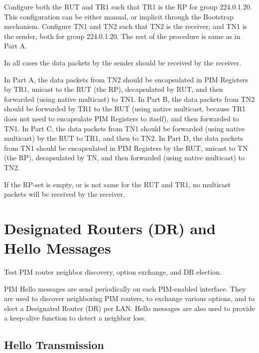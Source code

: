 \documentclass[11pt]{report}
\begin{document}

Configure both the RUT and TR1 such that TR1 is the RP for group
224.0.1.20. This configuration can be either manual, or implicit through the
Bootstrap mechanism. Configure TN1 and TN2 such that TN2 is the receiver, and
TN1 is the sender, both for group 224.0.1.20. The rest of the procedure is
same as in Part A.

In all cases the data packets by the sender should be received by the
receiver.

In Part A, the data packets from TN2 should be encapsulated in PIM Registers
by TR1, unicast to the RUT (the RP), decapsulated by RUT, and then forwarded
(using native multicast) to TN1.
In Part B, the data packets from TN2 should be forwarded by TR1 to the RUT
(using native multicast, because TR1 does not need to encapsulate PIM Registers
to itself), and then forwarded to TN1.
In Part C, the data packets from TN1 should be forwarded (using native
multicast) by the RUT to TR1, and then to TN2.
In Part D, the data packets from TN1 should be encapsulated in PIM Registers
by the RUT, unicast to TN (the RP), decapsulated by TN, and then forwarded
(using native multicast) to TN2.

If the RP-set is empty, or is not same for
the RUT and TR1, no multicast packets will be received by the receiver.

\chapter{Designated Routers (DR) and Hello Messages}

Test PIM router neighbor discovery, option exchange, and DR election.

PIM Hello messages are send periodically on each
PIM-enabled interface. They are used to discover neighboring PIM routers,
to exchange various options, and to elect a Designated Router (DR) per LAN.
Hello messages are also used to provide a keep-alive function to detect a
neighbor loss.

\newpage
\section{Hello Transmission}
\end{document}
